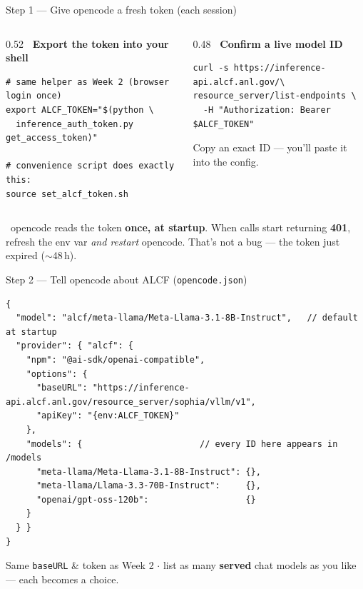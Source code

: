 \begin{frame}[fragile]{Step 1 --- Give opencode a fresh token (each session)}
  \begin{columns}[t, totalwidth=\textwidth]
    \begin{column}{0.52\textwidth}
      {\footnotesize\bfseries\color{accentblue}\faKey\ Export the token into your shell}
      \begin{lstlisting}[style=shell]
# same helper as Week 2 (browser login once)
export ALCF_TOKEN="$(python \
  inference_auth_token.py get_access_token)"

# convenience script does exactly this:
source set_alcf_token.sh
      \end{lstlisting}
    \end{column}
    \begin{column}{0.48\textwidth}
      {\footnotesize\bfseries\color{cRAG}\faList\ Confirm a live model ID}
      \begin{lstlisting}[style=shell]
curl -s https://inference-api.alcf.anl.gov/\
resource_server/list-endpoints \
  -H "Authorization: Bearer $ALCF_TOKEN"
      \end{lstlisting}
      {\scriptsize\color{midgray}Copy an exact ID --- you'll paste it into the config.}
    \end{column}
  \end{columns}
  \vspace{6pt}
  \begin{calloutbox}[accentgold]
    \small\faExclamationTriangle\ opencode reads the token \textbf{once, at startup}.
    When calls start returning \textbf{401}, refresh the env var \emph{and restart}
    opencode. That's not a bug --- the token just expired ($\sim$48\,h).
  \end{calloutbox}
\end{frame}

\begin{frame}[fragile]{Step 2 --- Tell opencode about ALCF (\texttt{opencode.json})}
  \begin{lstlisting}[style=shell, title={opencode.json --- one provider, a menu of models}]
{
  "model": "alcf/meta-llama/Meta-Llama-3.1-8B-Instruct",   // default at startup
  "provider": { "alcf": {
    "npm": "@ai-sdk/openai-compatible",
    "options": {
      "baseURL": "https://inference-api.alcf.anl.gov/resource_server/sophia/vllm/v1",
      "apiKey": "{env:ALCF_TOKEN}"
    },
    "models": {                       // every ID here appears in /models
      "meta-llama/Meta-Llama-3.1-8B-Instruct": {},
      "meta-llama/Llama-3.3-70B-Instruct":     {},
      "openai/gpt-oss-120b":                   {}
    }
  } }
}
  \end{lstlisting}
  \begin{center}\scriptsize\color{midgray}%
    Same \texttt{baseURL} \& token as Week 2 $\cdot$ list as many \textbf{served} chat models as you like --- each becomes a choice.\end{center}
\end{frame}

